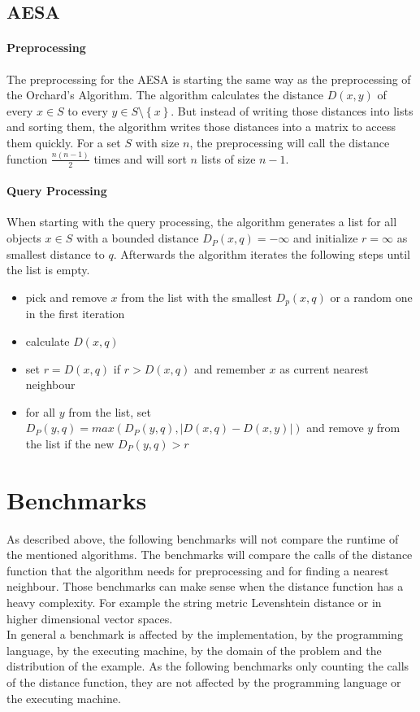 \documentclass[runningheads,a4paper]{llncs}
\begin{document}
\subsection{AESA}

\paragraph{Preprocessing}

The preprocessing for the AESA is starting the same way as the preprocessing of the Orchard’s Algorithm. The algorithm
calculates the distance $D(x, y)$ of every $x \in S$ to every $y \in S\setminus\left\{ {x}\right\}$. But instead of
writing those distances into lists and sorting them, the algorithm writes those distances into a matrix to access them
quickly. For a set $S$ with size $n$, the preprocessing will call the distance function $\frac{n(n-1)}{2}$ times and
will sort $n$ lists of size $n-1$.

\paragraph{Query Processing}

When starting with the query processing, the algorithm generates a list for all objects $x \in S$ with a bounded
distance $D_P(x, q) = -\infty$ and initialize $r = \infty$ as smallest distance to $q$. Afterwards the algorithm
iterates the following steps until the list is empty.
\begin{itemize}
	\item pick and remove $x$ from the list with the smallest $D_p(x, q)$ or a random one in the first iteration
	\item calculate $D(x, q)$
	\item set $r = D(x, q)$ if $r > D(x, q)$ and remember $x$ as current nearest neighbour
	\item for all $y$ from the list, set $D_P(y, q) = max(D_P(y, q), |D(x, q) - D(x, y)|)$ and remove $y$ from the list
		if the new $D_P(y, q) > r$
\end{itemize}

\section{Benchmarks}

As described above, the following benchmarks will not compare the runtime of the mentioned algorithms. The benchmarks
will compare the calls of the distance function that the algorithm needs for preprocessing and for finding a nearest
neighbour. Those benchmarks can make sense when the distance function has a heavy complexity. For example the string
metric Levenshtein distance or in higher dimensional vector spaces.\\
In general a benchmark is affected by the implementation, by the programming language, by the executing machine, by the
domain of the problem and the distribution of the example. As the following benchmarks only counting the calls of the
distance function, they are not affected by the programming language or the executing machine.
\end{document}

